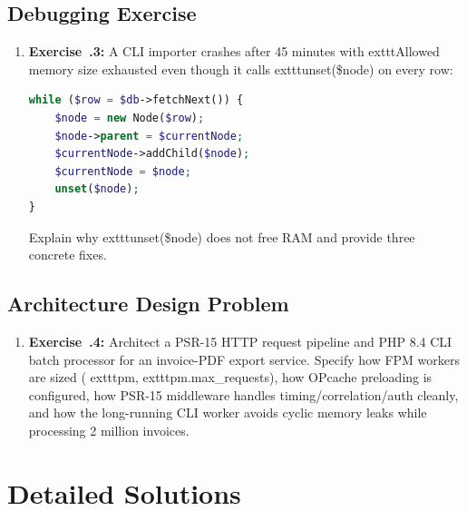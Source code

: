 \subsection{Debugging Exercise}
\begin{enumerate}[leftmargin=15pt]
  \item \textbf{Exercise~\thechapter.3:} A CLI importer crashes after 45 minutes with 	exttt{Allowed memory size exhausted} even though it calls 	exttt{unset(\$node)} on every row:
\begin{lstlisting}[language=PHP]
while ($row = $db->fetchNext()) {
    $node = new Node($row);
    $node->parent = $currentNode;
    $currentNode->addChild($node);
    $currentNode = $node;
    unset($node);
}
\end{lstlisting}
  Explain why 	exttt{unset(\$node)} does not free RAM and provide three concrete fixes.
\end{enumerate}

\subsection{Architecture Design Problem}
\begin{enumerate}[leftmargin=15pt]
  \item \textbf{Exercise~\thechapter.4:} Architect a PSR-15 HTTP request pipeline and PHP 8.4 CLI batch processor for an invoice-PDF export service. Specify how FPM workers are sized (	exttt{pm}, 	exttt{pm.max\_requests}), how OPcache preloading is configured, how PSR-15 middleware handles timing/correlation/auth cleanly, and how the long-running CLI worker avoids cyclic memory leaks while processing 2 million invoices.
\end{enumerate}

\section{Detailed Solutions}

